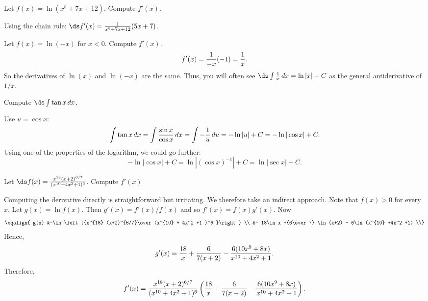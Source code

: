 \begin{theorem}
\begin{theorem}
\begin{theorem}

\begin{example} Let $f(x) =\ln (x^5 + 7x +12) $. Compute $f'(x) $.

Using the chain rule:
$\ds f'(x) = {1\over x^5 +7x+ 12}(5x+7)$.
\end{example}

\begin{example} Let $f(x) =\ln (-x) $ for $x<0 $. Compute $f'(x) $.
$$f'(x) ={1\over -x}(-1) ={1\over x}.$$
So the derivatives of $\ln(x)$ and $\ln(-x)$ are the same. Thus, you
will often see $\ds\int{1\over x}\,dx=\ln|x|+C$ as the general
antiderivative of $1/x$.
\end{example}

\begin{example} Compute $\ds\int \tan x \,dx $.

Use $u=\cos x$:
$$
\int\tan x\,dx=\int{\sin x\over\cos x}\,dx=\int -{1\over u}\,du
=-\ln |u|+C = -\ln|\cos x| +C.$$
Using one of the properties of the logarithm, we could go further:
$$-\ln|\cos x| +C=\ln|(\cos x)^{-1}|+C=\ln|\sec x|+C.$$
\vglue-20pt\end{example}

\begin{example} Let $\ds f(x) = {x^{18} (x+2)^{6/7}\over (x^{10} + 4x^2 +1 )^6 }$.
 Compute $f'(x) $

 Computing the derivative directly is straightforward
 but irritating. We therefore take an indirect approach. Note that
 $f(x) >0 $ for every $x$.
 Let $g(x) = \ln f(x) $. Then $g'(x) = f'(x)/f(x)$ and so 
$f'(x) =f(x)g'(x)$. Now
$$\eqalign{
g(x) &=\ln\left({x^{18} (x+2)^{6/7}\over (x^{10} + 4x^2 +1 )^6 }\right) \\
&= 18\ln x +{6\over 7} \ln (x+2) - 6\ln (x^{10} +4x^2 +1) \\}$$
Hence, 
$$g'(x) = {18\over x} +{6\over 7(x+2)}
-{6(10x^9 +8x )\over x^{10} +4x^2 +1 }.$$
Therefore,
$$f'(x) = {x^{18} (x+2)^{6/7}\over (x^{10} + 4x^2 +1 )^6 }
\left({18\over x} +{6\over 7(x+2)}
-{6(10x^9 +8x )\over x^{10} +4x^2 +1 }\right).$$
\vglue-20pt\end{example}


\end{theorem}
\end{theorem}
\end{theorem}
